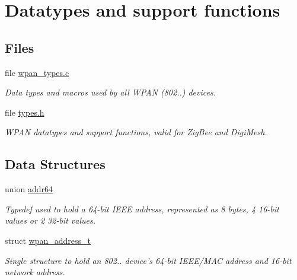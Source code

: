 \hypertarget{group__wpan__types}{\section{Datatypes and support functions}
\label{group__wpan__types}
}
\subsection*{Files}
\begin{DoxyCompactItemize}
\item 
file \hyperlink{wpan__types_8c}{wpan\-\_\-types.\-c}
\begin{DoxyCompactList}\small\item\em Data types and macros used by all W\-P\-A\-N (802..) devices. \end{DoxyCompactList}\item 
file \hyperlink{types_8h}{types.\-h}
\begin{DoxyCompactList}\small\item\em W\-P\-A\-N datatypes and support functions, valid for Zig\-Bee and Digi\-Mesh. \end{DoxyCompactList}\end{DoxyCompactItemize}
\subsection*{Data Structures}
\begin{DoxyCompactItemize}
\item 
union \hyperlink{unionaddr64}{addr64}
\begin{DoxyCompactList}\small\item\em Typedef used to hold a 64-\/bit I\-E\-E\-E address, represented as 8 bytes, 4 16-\/bit values or 2 32-\/bit values. \end{DoxyCompactList}\item 
struct \hyperlink{structwpan__address__t}{wpan\-\_\-address\-\_\-t}
\begin{DoxyCompactList}\small\item\em Single structure to hold an 802.. device's 64-\/bit I\-E\-E\-E/\-M\-A\-C address and 16-\/bit network address. \end{DoxyCompactList}\end{DoxyCompactItemize}
